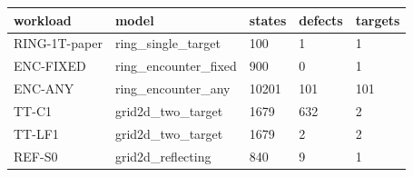 \begin{tabular}{lllll}
\toprule
workload & model & states & defects & targets \\
\midrule
RING-1T-paper & ring\_single\_target & 100 & 1 & 1 \\
ENC-FIXED & ring\_encounter\_fixed & 900 & 0 & 1 \\
ENC-ANY & ring\_encounter\_any & 10201 & 101 & 101 \\
TT-C1 & grid2d\_two\_target & 1679 & 632 & 2 \\
TT-LF1 & grid2d\_two\_target & 1679 & 2 & 2 \\
REF-S0 & grid2d\_reflecting & 840 & 9 & 1 \\
\bottomrule
\end{tabular}
